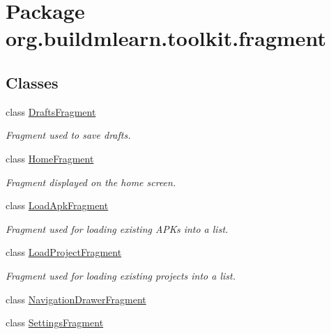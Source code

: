 \hypertarget{namespaceorg_1_1buildmlearn_1_1toolkit_1_1fragment}{}\section{Package org.\+buildmlearn.\+toolkit.\+fragment}
\label{namespaceorg_1_1buildmlearn_1_1toolkit_1_1fragment}
\subsection*{Classes}
\begin{DoxyCompactItemize}
\item 
class \hyperlink{classorg_1_1buildmlearn_1_1toolkit_1_1fragment_1_1DraftsFragment}{Drafts\+Fragment}
\begin{DoxyCompactList}\small\item\em Fragment used to save drafts. \end{DoxyCompactList}\item 
class \hyperlink{classorg_1_1buildmlearn_1_1toolkit_1_1fragment_1_1HomeFragment}{Home\+Fragment}
\begin{DoxyCompactList}\small\item\em Fragment displayed on the home screen. \end{DoxyCompactList}\item 
class \hyperlink{classorg_1_1buildmlearn_1_1toolkit_1_1fragment_1_1LoadApkFragment}{Load\+Apk\+Fragment}
\begin{DoxyCompactList}\small\item\em Fragment used for loading existing A\+P\+Ks into a list. \end{DoxyCompactList}\item 
class \hyperlink{classorg_1_1buildmlearn_1_1toolkit_1_1fragment_1_1LoadProjectFragment}{Load\+Project\+Fragment}
\begin{DoxyCompactList}\small\item\em Fragment used for loading existing projects into a list. \end{DoxyCompactList}\item 
class \hyperlink{classorg_1_1buildmlearn_1_1toolkit_1_1fragment_1_1NavigationDrawerFragment}{Navigation\+Drawer\+Fragment}
\item 
class \hyperlink{classorg_1_1buildmlearn_1_1toolkit_1_1fragment_1_1SettingsFragment}{Settings\+Fragment}
\end{DoxyCompactItemize}
